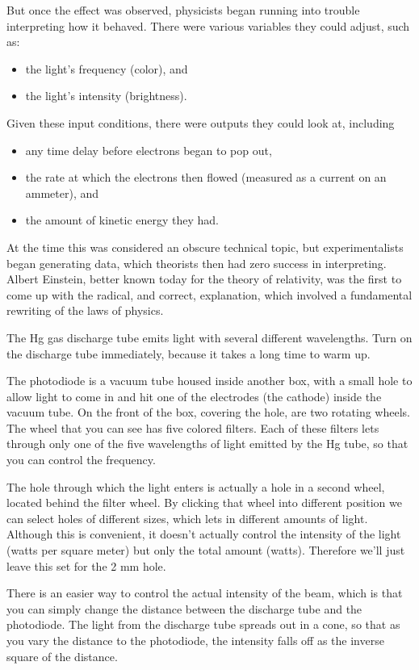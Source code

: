 But once the effect was observed, physicists began running into
trouble interpreting how it behaved. There were various variables
they could adjust, such as:
\begin{itemize}
 \item the light's frequency (color), and
 \item the light's intensity (brightness).
\end{itemize}
Given these input conditions, there were outputs
they could look at, including
\begin{itemize}
  \item any time delay before electrons began to pop out,
  \item the rate at which the electrons then flowed (measured as a current on an ammeter), and
  \item the amount of kinetic energy they had.
\end{itemize}

At the time this was considered an obscure technical topic, but experimentalists
began generating data, which theorists then had zero success in interpreting.
Albert Einstein,
better known today for the theory of relativity, was the
first to come up with the radical, and correct, explanation,
which involved a fundamental rewriting of the laws of physics.

\setup

The Hg gas discharge tube emits
light with several different wavelengths.
Turn on the discharge tube immediately, because it takes a long time to warm up.

The photodiode is a vacuum tube housed inside another box, with a small hole
to allow light to come in and hit one of the electrodes (the cathode) inside the vacuum tube.
On the front of the box, covering the hole, are two rotating wheels.  The wheel
that you can see has five colored filters. Each of these filters lets through only
one of the five wavelengths of light emitted by the Hg tube, so that you can control
the frequency.

The hole through which the light enters is actually
a hole in a second wheel, located behind the filter wheel. By clicking that wheel into different position we can
select holes of different sizes, which lets in different amounts of light.
Although this is convenient, it doesn't actually control the intensity of the light (watts per square meter)
but only the total amount (watts). Therefore we'll just leave this set for the 2 mm hole.

There is an easier way to control the actual intensity of the beam, which is that you can simply
change the distance between the discharge tube and the photodiode. The light from the discharge tube
spreads out in a cone, so that as you vary the distance to the photodiode, the intensity falls off as
the inverse square of the distance.

